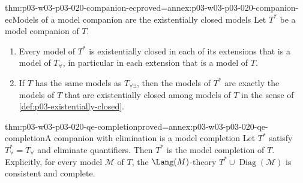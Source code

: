 \begin{hbtheorem}{thm:p03-w03-p03-020-companion-ec}{proved=annex:p03-w03-p03-020-companion-ec}{Models of a model companion are the existentially closed models}
Let \(T^*\) be a model companion of \(T\).
\begin{enumerate}
\item Every model of \(T^*\) is existentially closed in each of its
  extensions that is a model of \(T_\forall\), in particular in each
  extension that is a model of \(T\).
\item If \(T\) has the same models as \(T_{\forall\exists}\), then the
  models of \(T^*\) are exactly the models of \(T\) that are existentially
  closed among models of \(T\) in the sense of
  \cref{def:p03-existentially-closed}.
\end{enumerate}
\end{hbtheorem}

\begin{hbtheorem}{thm:p03-w03-p03-020-qe-completion}{proved=annex:p03-w03-p03-020-qe-completion}{A companion with elimination is a model completion}
Let \(T^*\) satisfy \(T^*_\forall=T_\forall\) and eliminate quantifiers.
Then \(T^*\) is the model completion of \(T\). Explicitly, for every model
\(\mathcal M\) of \(T\), the \(\Lang(M)\)-theory
\(T^*\cup\operatorname{Diag}(\mathcal M)\) is consistent and complete.
\end{hbtheorem}

